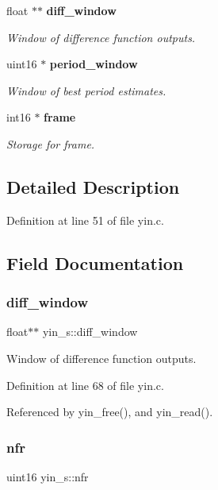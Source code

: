 \begin{DoxyCompactItemize}
float $\ast$$\ast$ \textbf{ diff\+\_\+window}
\begin{DoxyCompactList}\small\item\em Window of difference function outputs. \end{DoxyCompactList}\item 
uint16 $\ast$ \textbf{ period\+\_\+window}
\begin{DoxyCompactList}\small\item\em Window of best period estimates. \end{DoxyCompactList}\item 
\mbox{\label{structyin__s_adb8a1fa6168286b87244f35361a64926}} 
int16 $\ast$ \textbf{ frame}
\begin{DoxyCompactList}\small\item\em Storage for frame. \end{DoxyCompactList}\end{DoxyCompactItemize}


\subsection{Detailed Description}


Definition at line 51 of file yin.\+c.



\subsection{Field Documentation}
\mbox{\label{structyin__s_a41981e290a7b03ae2dae834d4b6bf930}} 
\subsubsection{diff\+\_\+window}
{\footnotesize\ttfamily float$\ast$$\ast$ yin\+\_\+s\+::diff\+\_\+window}



Window of difference function outputs. 



Definition at line 68 of file yin.\+c.



Referenced by yin\+\_\+free(), and yin\+\_\+read().

\mbox{\label{structyin__s_af4f11d14a36bbdc19863fa8335237423}} 
\subsubsection{nfr}
{\footnotesize\ttfamily uint16 yin\+\_\+s\+::nfr}



